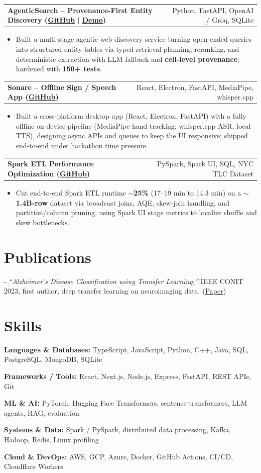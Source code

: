 \documentclass[letterpaper,11pt]{article}
\makeatletter
\newcommand{\projItem}[2]{%
  \vspace{2pt}
  \begin{tabular*}{\textwidth}{@{}l@{\extracolsep{\fill}}r@{}}
    \textbf{#1} & #2 \\
  \end{tabular*}\par\vspace{-3pt}
}
\newcommand{\skillLine}[2]{\textbf{#1:} #2\par\vspace{1.5pt}}
\newcommand{\inlineBlock}[1]{{\setlength{\leftskip}{0.18in}\small #1\par}}
\makeatother
\begin{document}
\projItem{AgenticSearch -- Provenance-First Entity Discovery {\normalfont\small(\href{https://github.com/Deva-1903/ciir_agentic_search}{GitHub} $\vert$ \href{https://agentic-search-negglszkwa-uc.a.run.app}{Demo})}}{Python, FastAPI, OpenAI / Groq, SQLite}
\begin{itemize}
  \item Built a multi-stage agentic web-discovery service turning open-ended queries into structured entity tables via typed retrieval planning, reranking, and deterministic extraction with LLM fallback and \textbf{cell-level provenance}; hardened with \textbf{150+ tests}.
\end{itemize}

\projItem{Sonare -- Offline Sign / Speech App {\normalfont\small(\href{https://github.com/Deva-1903/Qualcomm-Sep25-Team-Sonare}{GitHub})}}{React, Electron, FastAPI, MediaPipe, whisper.cpp}
\begin{itemize}
  \item Built a cross-platform desktop app (React, Electron, FastAPI) with a fully offline on-device pipeline (MediaPipe hand tracking, whisper.cpp ASR, local TTS), designing async APIs and queues to keep the UI responsive; shipped end-to-end under hackathon time pressure.
\end{itemize}

\projItem{Spark ETL Performance Optimization {\normalfont\small(\href{https://github.com/Deva-1903/Spark-ETL-Optimization}{GitHub})}}{PySpark, Spark UI, SQL, NYC TLC Dataset}
\begin{itemize}
  \item Cut end-to-end Spark ETL runtime \textbf{$\sim$25\%} (17--19 min to 14.3 min) on a \textbf{$\sim$1.4B-row} dataset via broadcast joins, AQE, skew-join handling, and partition/column pruning, using Spark UI stage metrics to localize shuffle and skew bottlenecks.
\end{itemize}

\section{Publications}
\vspace{2pt}
\inlineBlock{- \textit{``Alzheimer's Disease Classification using Transfer Learning,''} IEEE CONIT 2023, first author, deep transfer learning on neuroimaging data. {\normalfont\small(\href{https://ieeexplore.ieee.org/document/10205760}{Paper})}}

\section{Skills}
\skillLine{Languages \& Databases}{TypeScript, JavaScript, Python, C++, Java, SQL, PostgreSQL, MongoDB, SQLite}
\skillLine{Frameworks / Tools}{React, Next.js, Node.js, Express, FastAPI, REST APIs, Git}
\skillLine{ML \& AI}{PyTorch, Hugging Face Transformers, sentence-transformers, LLM agents, RAG, evaluation}
\skillLine{Systems \& Data}{Spark / PySpark, distributed data processing, Kafka, Hadoop, Redis, Linux profiling}
\skillLine{Cloud \& DevOps}{AWS, GCP, Azure, Docker, GitHub Actions, CI/CD, Cloudflare Workers}
\end{document}
